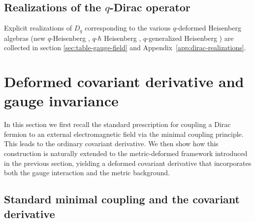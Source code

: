 \documentclass[12pt,a4paper]{article}
\theoremstyle{plain}
\theoremstyle{definition}
\begin{document}
\subsection{Realizations of the $q$-Dirac operator}

Explicit realizations of $D_q$ corresponding to the various $q$-deformed Heisenberg algebras  (new $q$-Heisenberg \cite{Jaramillo2026a}, $q$-$\hbar$ Heisenberg \cite{Volovich-Arefeva-91}, $q$-generalized Heisenberg \cite{Razavinia-Lopes2022}) are collected in section \ref{sec:table-gauge-field} and Appendix~\ref{app:dirac-realizations}.

\section{Deformed covariant derivative and gauge invariance}
\label{sec:deformedDV}

In this section we first recall the standard prescription for coupling a Dirac fermion to an external electromagnetic field via the minimal coupling principle. This leads to the ordinary covariant derivative. We then show how this construction is naturally extended to the metric-deformed framework introduced in the previous section, yielding a deformed covariant derivative that incorporates both the gauge interaction and the metric background.

\subsection{Standard minimal coupling and the covariant derivative}
\end{document}
